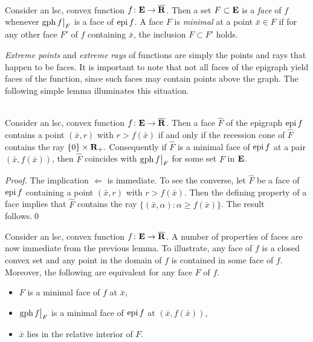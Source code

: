 \documentclass[smallextended,numbook]{svjour3}
\begin{document}
\begin{defn}\label{defn:face_gen}\hfill \\
{\rm 
Consider an lsc, convex function $f\colon{{\bf E}}\to\overline{{\bf R}}$. 
Then a set $F\subset{{\bf E}}$ is a {\em face} of $f$ whenever ${\mbox{\rm gph}\,} f\big|_F$ is a face of ${\mbox{\rm epi}\,} f$. A face $F$ is {\em minimal} at a point $\bar{x}\in F$ if for any other face $F'$ of $f$ containing $\bar{x}$, the inclusion $F\subset F'$ holds.}
\end{defn}
{\em Extreme points} and {\em extreme rays} of functions are simply the points and rays that happen to be faces. It is important to note that not all faces of the epigraph yield faces of the function, since such faces may contain points above the graph. 
The following simple lemma illuminates this situation.
\begin{lem}\label{lem:prep} \hfill \\
Consider an lsc, convex function $f\colon{{\bf E}}\to\overline{{\bf R}}$. Then a face $\widehat{F}$ of the epigraph ${\mbox{\rm epi}\,} f$ contains a point $(\bar{x},r)$ with $r > f(\bar{x})$ if and only if the recession cone of $\widehat{F}$ contains the ray $\{0\}\times{{\bf R}}_+.$
Consequently if $\widehat{F}$ is a minimal face of ${\mbox{\rm epi}\,} f$ at  a pair $(\bar{x},f(\bar{x}))$, then $\widehat{F}$ coincides with ${\mbox{\rm gph}\,} f\big|_F$ for some set $F$ in ${{\bf E}}$.
\end{lem}
\begin{proof}
The implication $\Leftarrow$ is immediate.
To see the converse, let $\widehat{F}$ be a face of ${\mbox{\rm epi}\,} f$ containing a point $(\bar{x},r)$ with $r > f(\bar{x})$. Then the defining property of a face implies that $\widehat{F}$ contains the ray $\{(\bar{x},\alpha): \alpha \geq f(\bar{x})\}$. The result follows.\qed
\end{proof}

Consider an lsc, convex function $f\colon{{\bf E}}\to\overline{{\bf R}}$. A number of properties of faces are now immediate from the previous lemma.  To illustrate, any face of $f$ is a closed convex set and any point in the domain of $f$ is contained in some face of $f$.
Moreover, the following are equivalent for any face $F$ of $f$.
\begin{itemize}
\item $F$ is a minimal face of $f$ at $\bar{x}$,
\item ${\mbox{\rm gph}\,} f\big|_F$ is a minimal face of ${\mbox{\rm epi}\,} f$ at $(\bar{x},f(\bar{x}))$,
\item $\bar{x}$ lies in the relative interior of $F$.
\end{itemize}
\end{document}
